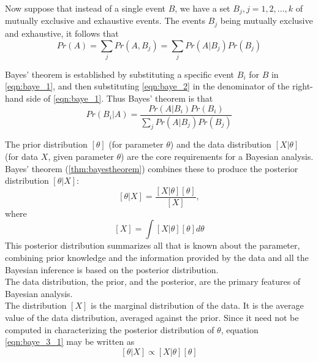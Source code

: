 				Now suppose that instead of a single event $B$, we have a set $B_j,j = 1,2,. . . ,k$ of mutually exclusive and exhaustive events. The events $B_j$ being mutually exclusive and exhaustive, it follows that
				\begin{equation}\label{eqn:baye_2}
					Pr(A) = \sum_j Pr(A,B_j) = \sum_j Pr(A|B_j) Pr(B_j)
				\end{equation}

				\begin{thm}\label{thm:bayestheorem}\cite{link2009bayesian}
					Bayes’ theorem is established by substituting a specific event $B_i$ for $B$ in \eqref{eqn:baye_1}, and then substituting \eqref{eqn:baye_2} in the denominator of the right-hand side of \eqref{eqn:baye_1}. Thus Bayes’ theorem is that	\\
					\begin{equation}
						Pr(B_i|A) = \frac{Pr(A|B_i)Pr(B_i)}{\sum_j Pr(A|B_j) Pr(B_j)}
					\end{equation}
				\end{thm}


				The prior distribution $[\theta]$ (for parameter $\theta$) and the data distribution $[X|\theta]$ (for data $X$, given parameter $\theta$) are the core requirements for a Bayesian analysis. Bayes' theorem (\ref{thm:bayestheorem}) combines these to produce the posterior distribution $[\theta|X]$:
				\begin{equation}\label{eqn:baye_3_1}
					[\theta|X] = \frac{[X|\theta][\theta]}{[X]},
				\end{equation}
				where
				\begin{equation}\label{eqn:baye_3_2}
					[X]=\int [X|\theta][\theta]d\theta
				\end{equation}
				This posterior distribution summarizes all that is known about the parameter, combining prior knowledge and the information provided by the data and all the Bayesian inference is based on the posterior distribution.\\
				The data distribution, the prior, and the posterior, are the primary	features of Bayesian analysis.\\
				The distribution $[X]$ is the marginal distribution of the data. It is the average value of the data distribution, averaged against the prior. Since it need not be computed in characterizing the posterior distribution of $\theta$, equation \eqref{eqn:baye_3_1} may be written as
				\begin{equation}\label{eqn:baye_4}
					[\theta|X] \propto [X|\theta][\theta]
				\end{equation}

